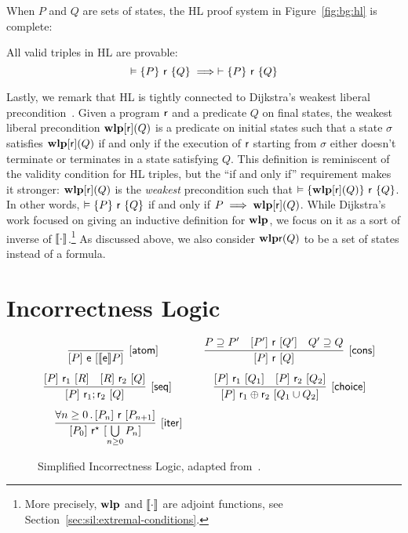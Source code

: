 When $P$ and $Q$ are sets of states, the HL proof system in Figure~\ref{fig:bg:hl} is complete:

\begin{theorem}
	All valid triples in HL are provable:
	\[
	\vDash \{P\}~\mathsf{r}~\{Q\} \implies \vdash \{P\}~\mathsf{r}~\{Q\}
	\]
\end{theorem}

Lastly, we remark that HL is tightly connected to Dijkstra's weakest liberal precondition~\cite{Dijkstra75}. Given a program $\mathsf{r}$ and a predicate $Q$ on final states, the weakest liberal precondition $\textbf{wlp}[\mathsf{r}](Q)$ is a predicate on initial states such that a state $\sigma$ satisfies $\textbf{wlp}[\mathsf{r}](Q)$ if and only if the execution of $\mathsf{r}$ starting from $\sigma$ either doesn't terminate or terminates in a state satisfying $Q$. This definition is reminiscent of the validity condition for HL triples, but the ``if and only if'' requirement makes it stronger: $\textbf{wlp}[\mathsf{r}](Q)$ is the \emph{weakest} precondition such that $\vDash \{\textbf{wlp}[\mathsf{r}](Q)\}~\mathsf{r}~\{Q\}$. In other words, $\vDash \{P\}~\mathsf{r}~\{Q\}$ if and only if $P \implies \textbf{wlp}[\mathsf{r}](Q)$.
While Dijkstra's work focused on giving an inductive definition for $\textbf{wlp}$, we focus on it as a sort of inverse of $\llbracket\cdot\rrbracket$.\footnote{More precisely, $\textbf{wlp}$ and $\llbracket\cdot\rrbracket$ are adjoint functions, see Section~\ref{sec:sil:extremal-conditions}.} As discussed above, we also consider $\textbf{wlp}{\mathsf{r}}(Q)$ to be a set of states instead of a formula.

\section{Incorrectness Logic}\label{sec:bg:il}

\begin{figure}[t]
	\centering
	\begin{framed}
		\(
		\begin{array}{cc}
			\infer[\ilrule{atom}]
			{\iltriple{P}{\expe}{\denot{\expe}P}}
			{}
			\quad                       &
			\infer[\ilrule{cons}]
			{\iltriple{P}{\regr}{Q}}
			{P \supseteq P'             & \iltriple{P'}{\regr}{Q'}    & Q' \supseteq Q}
			\\[7.5pt]
			\infer[\ilrule{seq}]
			{\iltriple{P}{\regr_1;\regr_2}{Q}}
			{\iltriple{P}{\regr_1}{R}   & \iltriple{R}{\regr_2}{Q}}
			\qquad                      &
			\infer[\ilrule{choice}]
			{\iltriple{P}{\regr_1 \regplus \regr_2}{Q_1 \cup Q_2}}
			{\iltriple{P}{\regr_1}{Q_1} & \iltriple{P}{\regr_2}{Q_2}}
			\\[7.5pt]
			\infer[\ilrule{iter}]
			{\iltriple{P_0}{\regr^\kstar}{\bigcup\limits_{n \ge 0} P_n}}
			{\forall n \ge 0 \sdot \iltriple{P_n}{\regr}{P_{n+1}}}
		\end{array}
		\)
	\end{framed}
	\vspace{-1ex}
	\caption{Simplified Incorrectness Logic, adapted from~\cite{MOH21}.}
	\label{fig:bg:il}
\end{figure}


